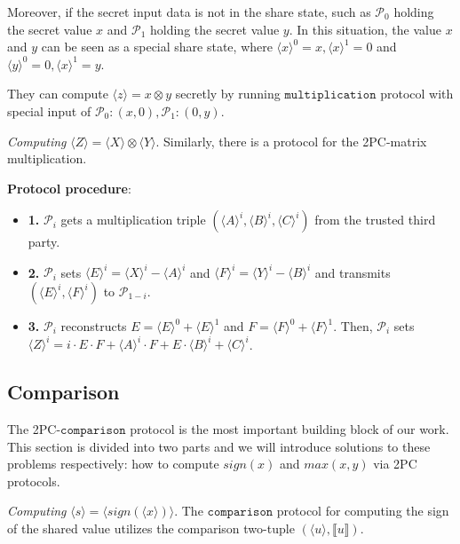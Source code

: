 \documentclass[letterpaper]{article} %
\begin{document}
    Moreover, if the secret input data is not in the share state,
    such as $\mathcal{P}_{0}$ holding the secret value $x$
    and $\mathcal{P}_{1}$ holding the secret value $y$.
    In this situation, the value $x$ and $y$ can be
    seen as a special share state, where
    $\langle x\rangle ^{0}=x,\langle x\rangle ^{1}=0$ and
    $\langle y\rangle ^{0}=0,\langle x\rangle ^{1}=y$.

    They can compute $\langle z\rangle=x\otimes y$ secretly
    by running $\mathtt{multiplication}$ protocol with special input of
    $\mathcal{P}_{0}:(x,0),\mathcal{P}_{1}:(0,y)$.

    \emph{Computing} $ \langle Z\rangle  = \langle X\rangle  \otimes \langle Y\rangle$.
    Similarly, there is a protocol for the 2PC-matrix multiplication.

    \textbf{Protocol procedure}:
    \begin{itemize}
        \item \textbf{1.} $\mathcal{P}_{i}$ gets a multiplication triple
        $(\langle A\rangle ^{i},\langle B\rangle ^{i},\langle C\rangle ^{i})$ from the trusted third party.
        \item \textbf{2.} $\mathcal{P}_{i}$ sets $\langle E\rangle ^{i}=\langle X\rangle ^{i}-\langle A\rangle ^{i}$ and $\langle F\rangle ^{i}=\langle Y\rangle ^{i}-\langle B\rangle ^{i}$
        and transmits $(\langle E\rangle ^{i},\langle F\rangle ^{i})$ to $\mathcal{P}_{1-i}$.
        \item \textbf{3.} $\mathcal{P}_{i}$ reconstructs $E = \langle E\rangle ^{0}+\langle E\rangle ^{1}$ and $F = \langle F\rangle ^{0}+\langle F\rangle ^{1}$.
        Then, $\mathcal{P}_{i}$ sets $\langle Z\rangle^{i}=i\cdot E \cdot F + \langle A\rangle^{i} \cdot F + E \cdot \langle B\rangle^{i} + \langle C\rangle^{i}$.

    \end{itemize}

    \subsection{Comparison}
    The 2PC-$\mathtt{comparison}$ protocol is the most important building block of our work.
    This section is divided into two parts and we will introduce solutions to these problems respectively:
    how to compute $sign(x)$ and $max(x,y)$ via 2PC protocols.

    \emph{Computing} $\langle s\rangle  = \langle sign(\langle x\rangle)\rangle $.
    The $\mathtt{comparison}$ protocol for computing the sign of the shared value utilizes the comparison two-tuple $(\langle u\rangle,\llbracket u \rrbracket )$.
\end{document}

